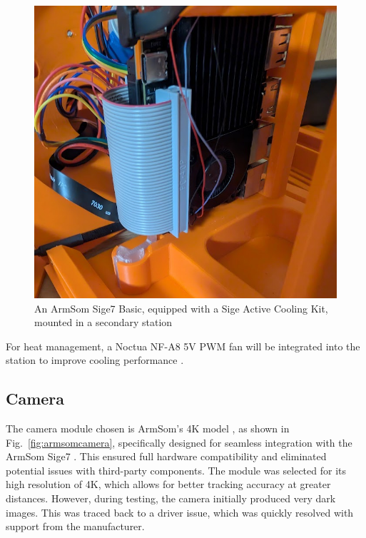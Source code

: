 \begin{figure}[H]
	\centering
	\includegraphics[width=1.0\linewidth]{figures/armsom_sige7}
	\caption{An ArmSom Sige7 Basic, equipped with a Sige Active Cooling Kit, mounted in a secondary station}
	\label{fig:armsomsige7}
\end{figure}

For heat management, a Noctua NF-A8 5V PWM fan will be integrated into the station to improve cooling performance \cite{noctua_fan_nf_a8}.

\subsection{Camera}

The camera module chosen is ArmSom's 4K model \cite{armsom_camera_module}, as shown in Fig.~\ref{fig:armsomcamera}, specifically designed for seamless integration with the ArmSom Sige7 \cite{armsom_sige7}. This ensured full hardware compatibility and eliminated potential issues with third-party components. The module was selected for its high resolution of 4K, which allows for better tracking accuracy at greater distances. However, during testing, the camera initially produced very dark images. This was traced back to a driver issue, which was quickly resolved with support from the manufacturer.

